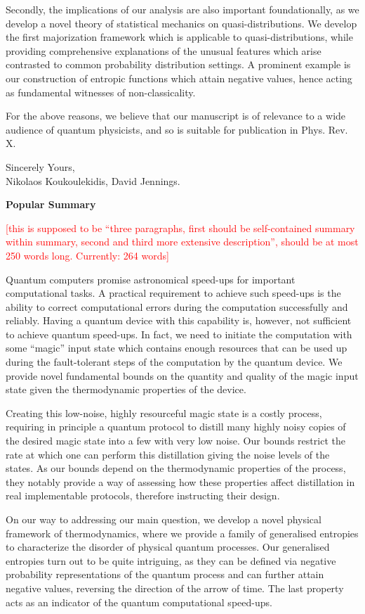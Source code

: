 \documentclass[11pt]{letter}
\newcommand{\nick}[1]{\textcolor{red}{[#1]}}
\begin{document}
Secondly, the implications of our analysis are also important foundationally, as we develop a novel theory of statistical mechanics on quasi-distributions.
We develop the first majorization framework which is applicable to quasi-distributions, while providing comprehensive explanations of the unusual features which arise contrasted to common probability distribution settings.
A prominent example is our construction of entropic functions which attain negative values, hence acting as fundamental witnesses of non-classicality.

For the above reasons, we believe that our manuscript is of relevance to a wide audience of quantum physicists, and so is suitable for publication in Phys. Rev. X.

\vspace{1cm}
\hspace{8cm}
\begin{minipage}{9cm}
\flushleft
Sincerely Yours,\\

Nikolaos Koukoulekidis, David Jennings.
\end{minipage}
\newpage


\textbf{Popular Summary}

\nick{this is supposed to be ``three paragraphs, first should be self-contained summary within summary, second and third more extensive description'', should be at most 250 words long. Currently: 264 words}

Quantum computers promise astronomical speed-ups for important computational tasks.
A practical requirement to achieve such speed-ups is the ability to correct computational errors during the computation successfully and reliably.
Having a quantum device with this capability is, however, not sufficient to achieve quantum speed-ups.
In fact, we need to initiate the computation with some ``magic'' input state which contains enough resources that can be used up during the fault-tolerant steps of the computation by the quantum device.
We provide novel fundamental bounds on the quantity and quality of the magic input state given the thermodynamic properties of the device.

Creating this low-noise, highly resourceful magic state is a costly process, requiring in principle a quantum protocol to distill many highly noisy copies of the desired magic state into a few with very low noise.
Our bounds restrict the rate at which one can perform this distillation giving the noise levels of the states.
As our bounds depend on the thermodynamic properties of the process, they notably provide a way of assessing how these properties affect distillation in real implementable protocols, therefore instructing their design.

On our way to addressing our main question, we develop a novel physical framework of thermodynamics, where we provide a family of generalised entropies to characterize the disorder of physical quantum processes.
Our generalised entropies turn out to be quite intriguing, as they can be defined via negative probability representations of the quantum process and can further attain negative values, reversing the direction of the arrow of time.
The last property acts as an indicator of the quantum computational speed-ups.
\end{document}
